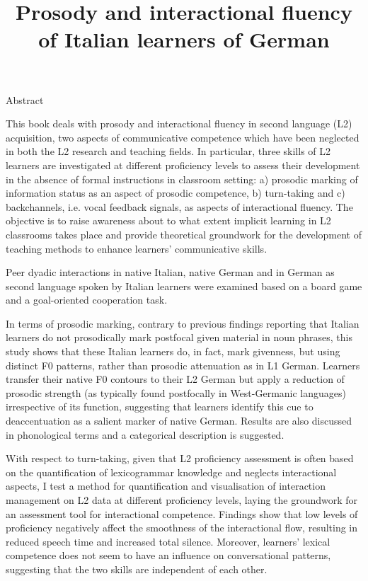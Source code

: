 
\title{Prosody and interactional fluency of Italian learners of German}

\begin{stylelsAbstract}
Abstract
\end{stylelsAbstract}

\begin{stylelsAbstract}
This book deals with prosody and interactional fluency in second language (L2) acquisition, two aspects of communicative competence which have been neglected in both the L2 research and teaching fields. In particular, three skills of L2 learners are investigated at different proficiency levels to assess their development in the absence of formal instructions in classroom setting: a) prosodic marking of information status as an aspect of prosodic competence, b) turn-taking and c) backchannels, i.e. vocal feedback signals, as aspects of interactional fluency. The objective is to raise awareness about to what extent implicit learning in L2 classrooms takes place and provide theoretical groundwork for the development of teaching methods to enhance learners’ communicative skills.
\end{stylelsAbstract}

\begin{stylelsAbstract}
Peer dyadic interactions in native Italian, native German and in German as second language spoken by Italian learners were examined based on a board game and a goal-oriented cooperation task.
\end{stylelsAbstract}

\begin{stylelsAbstract}
In terms of prosodic marking, contrary to previous findings reporting that Italian learners do not prosodically mark postfocal given material in noun phrases, this study shows that these Italian learners do, in fact, mark givenness, but using distinct F0 patterns, rather than prosodic attenuation as in L1 German. Learners transfer their native F0 contours to their L2 German but apply a reduction of prosodic strength (as typically found postfocally in West-Germanic languages) irrespective of its function, suggesting that learners identify this cue to deaccentuation as a salient marker of native German. Results are also discussed in phonological terms and a categorical description is suggested.
\end{stylelsAbstract}

\begin{stylelsAbstract}
With respect to turn-taking, given that L2 proficiency assessment is often based on the quantification of lexicogrammar knowledge and neglects interactional aspects, I test a method for quantification and visualisation of interaction management on L2 data at different proficiency levels, laying the groundwork for an assessment tool for interactional competence. Findings show that low levels of proficiency negatively affect the smoothness of the interactional flow, resulting in reduced speech time and increased total silence. Moreover, learners’ lexical competence does not seem to have an influence on conversational patterns, suggesting that the two skills are independent of each other.
\end{stylelsAbstract}


